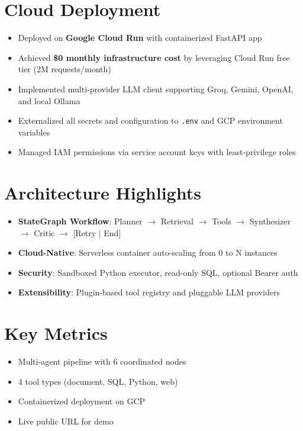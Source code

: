 \documentclass[11pt]{article}
\begin{document}
\section{Cloud Deployment}
\begin{itemize}[leftmargin=*]
    \item Deployed on \textbf{Google Cloud Run} with containerized FastAPI app
    \item Achieved \textbf{\$0 monthly infrastructure cost} by leveraging Cloud Run free tier (2M requests/month)
    \item Implemented multi-provider LLM client supporting Groq, Gemini, OpenAI, and local Ollama
    \item Externalized all secrets and configuration to \texttt{.env} and GCP environment variables
    \item Managed IAM permissions via service account keys with least-privilege roles
\end{itemize}

\section{Architecture Highlights}
\begin{itemize}[leftmargin=*]
    \item \textbf{StateGraph Workflow}: Planner $\rightarrow$ Retrieval $\rightarrow$ Tools $\rightarrow$ Synthesizer $\rightarrow$ Critic $\rightarrow$ [Retry $|$ End]
    \item \textbf{Cloud-Native}: Serverless container auto-scaling from 0 to N instances
    \item \textbf{Security}: Sandboxed Python executor, read-only SQL, optional Bearer auth
    \item \textbf{Extensibility}: Plugin-based tool registry and pluggable LLM providers
\end{itemize}

\section{Key Metrics}
\begin{itemize}[leftmargin=*]
    \item Multi-agent pipeline with 6 coordinated nodes
    \item 4 tool types (document, SQL, Python, web)
    \item Containerized deployment on GCP
    \item Live public URL for demo
\end{itemize}
\end{document}

